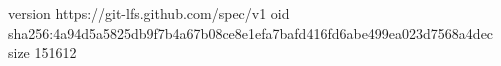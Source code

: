 version https://git-lfs.github.com/spec/v1
oid sha256:4a94d5a5825db9f7b4a67b08ce8e1efa7bafd416fd6abe499ea023d7568a4dec
size 151612
